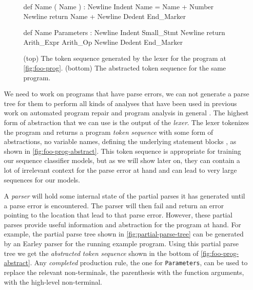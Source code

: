 \begin{figure}[ht]
\begin{ecode}
def Name ( Name ) : Newline
Indent Name = Name + Number Newline
return Name + Newline
Dedent End_Marker
\end{ecode}

\begin{ecode}
def Name Parameters : Newline
Indent Small_Stmt Newline
return Arith_Expr Arith_Op Newline
Dedent End_Marker
\end{ecode}
\caption{(top) The token sequence generated by the lexer for the program at
\autoref{fig:foo-prog}. (bottom) The abstracted token sequence for the same
program.}
\label{fig:foo-prog-abstract}
\end{figure}

We need to work on programs that have parse errors, \ie we can not generate a
parse tree for them to perform all kinds of analyses that have been used in
previous work on automated program repair \citep{?} and program analysis in
general \citep{?}.
%
The highest form of abstraction that we can use is the output of the
\emph{lexer}. The lexer tokenizes the program and returns a program \emph{token
sequence} with some form of abstractions, \eg no variable names, defining the
underlying statement blocks \etc, as shown in \autoref{fig:foo-prog-abstract}.
This token sequence is appropriate for training our sequence classifier models,
but as we will show later on, they can contain a lot of irrelevant context for
the parse error at hand and can lead to very large sequences for our models.

 A \emph{parser} will hold some
internal state of the partial parses it has generated until a parse error is
encountered. The parser will then fail and return an error pointing to the
location that lead to that parse error. However, these partial parses provide
useful information and abstraction for the program at hand. For example, the
partial parse tree shown in \autoref{fig:partial-parse-tree} can be generated by
an Earley parser for the running example program. Using this partial parse tree
we get the \emph{abstracted token sequence} shown in the bottom of
\autoref{fig:foo-prog-abstract}. Any \emph{completed} production rule, \ie the
one for \texttt{Parameters}, can be used to replace the relevant non-terminals,
\ie the parenthesis with the function arguments, with the high-level
non-terminal.



